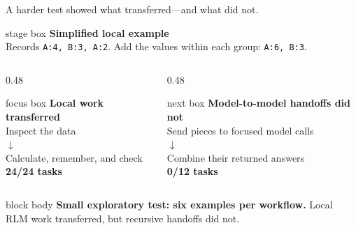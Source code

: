 \documentclass[aspectratio=169,11pt]{beamer}
\newcommand{\rlmstagebox}[1]{%
  \begin{beamercolorbox}[wd=\linewidth,sep=.55em,center,rounded=true]{stage box}
    #1
  \end{beamercolorbox}%
}
\newcommand{\rlmfocusbox}[1]{%
  \begin{beamercolorbox}[wd=\linewidth,sep=.55em,center,rounded=true]{focus box}
    #1
  \end{beamercolorbox}%
}
\newcommand{\rlmnextbox}[1]{%
  \begin{beamercolorbox}[wd=\linewidth,sep=.55em,center,rounded=true]{next box}
    #1
  \end{beamercolorbox}%
}
\begin{document}
\begin{frame}{A harder test showed what transferred---and what did not.}
  \rlmstagebox{\textbf{Simplified local example}\\[.2em]
    \small Records \texttt{A:4, B:3, A:2}. Add the values within each group:
    \texttt{A:6, B:3}.}

  \vspace{.25cm}
  \begin{columns}[T,onlytextwidth]
    \begin{column}{0.48\textwidth}
      \centering
      \rlmfocusbox{\textbf{Local work transferred}\\[.35em]
        \small Inspect the data\\[-.05em]
        {\color{RlmTeal}$\downarrow$}\\[-.05em]
        Calculate, remember, and check\\[.4em]
        {\Large\color{RlmNavy}\textbf{24/24 tasks}}}
    \end{column}

    \begin{column}{0.48\textwidth}
      \centering
      \rlmnextbox{\textbf{Model-to-model handoffs did not}\\[.35em]
        \small Send pieces to focused model calls\\[-.05em]
        {\color{RlmGold}$\downarrow$}\\[-.05em]
        Combine their returned answers\\[.4em]
        {\Large\color{RlmRed}\textbf{0/12 tasks}}}
    \end{column}
  \end{columns}

  \vspace{0.25cm}
  \begin{beamercolorbox}[wd=\linewidth,sep=.6em,rounded=true]{block body}
    \centering
    \textbf{Small exploratory test: six examples per workflow.} Local RLM work transferred, but
    recursive handoffs did not.
  \end{beamercolorbox}
\end{frame}
\end{document}
